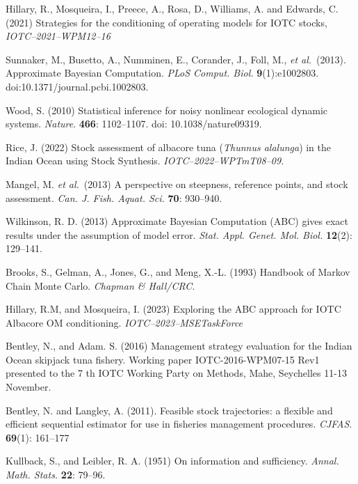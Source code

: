\documentclass[12pt,a4paper,twoside,times,sky,standard]{csiroreport2017}
\newcommand{\etal}{\textit{et al.}}
\begin{document}
\clearpage
\begin{thebibliography}{99}
       
     Hillary, R., Mosqueira, I., Preece, A., Rosa, D., Williams, A. and Edwards, C. (2021) Strategies for the conditioning of operating models for IOTC stocks, \textit{IOTC--2021--WPM12--16}
    
     Sunnaker, M., Busetto, A., Numminen, E., Corander, J., Foll, M., \etal~(2013). Approximate Bayesian Computation. \textit{PLoS Comput. Biol.} {\bf 9}(1):e1002803. doi:10.1371/journal.pcbi.1002803.
         
     Wood, S. (2010) Statistical inference for noisy nonlinear ecological dynamic systems. \textit{Nature}. {\bf 466}: 1102--1107. doi: 10.1038/nature09319.

     Rice, J. (2022) Stock assessment of albacore tuna (\textit{Thunnus alalunga}) in the Indian Ocean using Stock Synthesis. \textit{IOTC--2022--WPTmT08--09}.

     Mangel, M. \etal~(2013) A perspective on steepness, reference points, and stock assessment. \textit{Can. J. Fish. Aquat. Sci.} {\bf 70}: 930--940.

     Wilkinson, R. D. (2013) Approximate Bayesian Computation (ABC) gives exact results under the assumption of model error. \textit{Stat. Appl. Genet. Mol. Biol.} {\bf 12}(2): 129--141.
    
     Brooks, S., Gelman, A., Jones, G., and Meng, X.-L. (1993) Handbook of Markov Chain Monte Carlo. \textit{Chapman \& Hall/CRC}.

     Hillary, R.M, and Mosqueira, I. (2023) Exploring the ABC approach for IOTC Albacore
        OM conditioning. \textit{IOTC--2023--MSETaskForce}
    
     Bentley, N., and Adam. S. (2016) Management strategy evaluation for the Indian Ocean skipjack tuna fishery. Working paper IOTC-2016-WPM07-15 Rev1 presented to the 7 th IOTC Working Party on Methods, Mahe, Seychelles 11-13 November.
    
     Bentley, N. and Langley, A. (2011). Feasible stock trajectories: a flexible and efficient sequential estimator for use in fisheries management procedures. \textit{CJFAS}. {\bf 69}(1): 161--177  

     Kullback, S., and Leibler, R. A. (1951) On information and sufficiency. \textit{Annal. Math. Stats.} {\bf 22}: 79--96.

\end{thebibliography}
\end{document}
